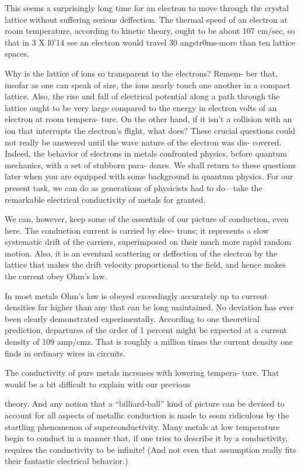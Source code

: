 This seems a surprisingly long time for an electron to move through
the crystal lattice without suffering serious deffection. The thermal
speed of an electron at room temperature, according to kinetic
theory, ought to be about 107 cm/sec, so that in 3 X l0'14 see an
electron would travel 30 angstr0ms-more than ten lattice spaces.

Why is the lattice of ions so transparent to the electrons? Remem-
ber that, insofar as one can speak of size, the ions nearly touch one
another in a compact lattice. Also, the rise and fall of electrical
potential along a path through the lattice ought to be very large compared
to the energy in electron volts of an electron at room tempera-
ture. On the other hand, if it isn't a collision with an ion that interrupts
the electron's ffight, what does? These crucial questions could
not really be answered until the wave nature of the electron was dis-
covered. Indeed, the behavior of electrons in metals confronted
physics, before quantum mechanics, with a set of stubborn para-
doxes. We shall return to these questions later when you are
equipped with some background in quantum physics. For our
present task, we can do as generations of physicists had to do---take
the remarkable electrical conductivity of metals for granted.

We can, however, keep some of the essentials of our picture of
conduction, even here. The conduction current is carried by elec-
trons; it represents a slow systematic drift of the carriers, superimposed
on their much more rapid random motion. Also, it is an
eventual scattering or deffection of the electron by the lattice that
makes the drift velocity proportional to the field, and hence makes
the current obey Ohm's law.

In most metals Ohm's law is obeyed exceedingly accurately up to
current densities far higher than any that can be long maintained.
No deviation has ever been clearly demonstrated experimentally.
According to one theoretical prediction, departures of the order of
1 percent might be expected at a current density of 109 amp/cmz.
That is roughly a million times the current density one finds in
ordinary wires in circuits.

The conductivity of pure metals increases with lowering tempera-
ture. That would be a bit difficult to explain with our previous

theory. And any notion that a ``billiard-ball'' kind of picture can be
devised to account for all aspects of metallic conduction is made to
seem ridiculous by the startling phenomenon of superconductivity.
Many metals at low temperature begin to conduct in a manner that,
if one tries to describe it by a conductivity, requires the conductivity
to be infinite! (And not even that assumption really fits their fantastic
electrical behavior.)

